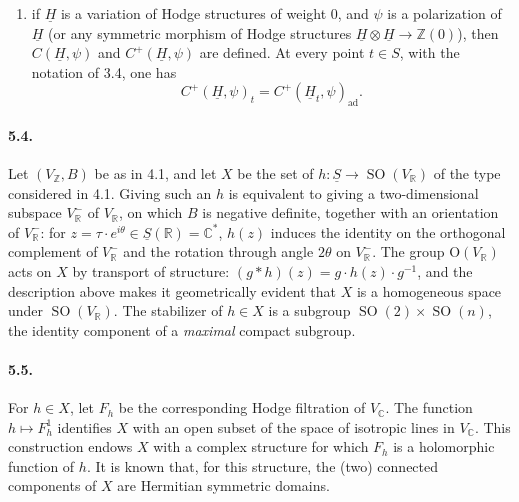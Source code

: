 \documentclass[10pt,leqno]{article}
\newcommand{\C}{\mathbb{C}}
\newcommand{\R}{\mathbb{R}}
\newcommand{\Z}{\mathbb{Z}}
\newcommand{\SO}{\operatorname{SO}}
\newcommand{\ad}{\operatorname{ad}}
\begin{document}
\clearpage

\begin{enumerate}[label=\alph*),start=2]
\item if $\underline H$ is a variation of Hodge structures of weight $0$, and $\psi$ is a polarization of $\underline H$ (or any symmetric morphism of Hodge structures $\underline H\otimes\underline H\to\Z(0)$), then $C(\underline H,\psi)$ and $C^+(\underline H,\psi)$ are defined. At every point $t\in S$, with the notation of 3.4, one has
\[
C^+(\underline H,\psi)_t=C^+(\underline H_t,\psi)_{\ad}.
\]
\end{enumerate}

\paragraph{5.4.} Let $(V_\Z,B)$ be as in 4.1, and let $X$ be the set of $h:\underline S\to\SO(V_\R)$ of the type considered in 4.1. Giving such an $h$ is equivalent to giving a two-dimensional subspace $V^-_\R$ of $V_\R$, on which $B$ is negative definite, together with an orientation of $V^-_\R$: for $z=\tau\cdot e^{i\theta}\in\underline S(\R)=\C^*$, $h(z)$ induces the identity on the orthogonal complement of $V^-_\R$ and the rotation through angle $2\theta$ on $V^-_\R$. The group $\mathrm O(V_\R)$ acts on $X$ by transport of structure: $(g*h)(z)=g\cdot h(z)\cdot g^{-1}$, and the description above makes it geometrically evident that $X$ is a homogeneous space under $\SO(V_\R)$. The stabilizer of $h\in X$ is a subgroup $\SO(2)\times\SO(n)$, the identity component of a \emph{maximal} compact subgroup.

\paragraph{5.5.} For $h\in X$, let $F_h$ be the corresponding Hodge filtration of $V_\C$. The function $h\mapsto F_h^1$ identifies $X$ with an open subset of the space of isotropic lines in $V_\C$. This construction endows $X$ with a complex structure for which $F_h$ is a holomorphic function of $h$. It is known that, for this structure, the (two) connected components of $X$ are Hermitian symmetric domains.
\end{document}
